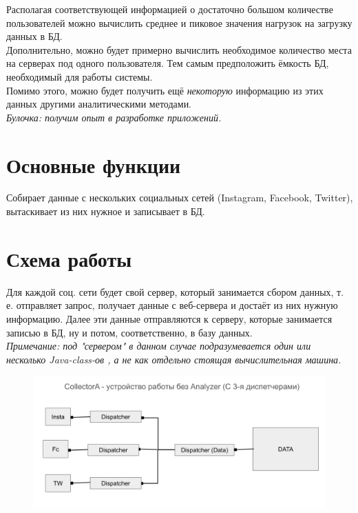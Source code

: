 \documentclass[12pt]{article}
\begin{document}
Располагая соответствующей информацией о достаточно большом количестве пользователей можно вычислить 
среднее и пиковое значения нагрузок на загрузку данных в БД. \\

Дополнительно, можно будет примерно вычислить необходимое количество
места на серверах под одного пользователя. Тем самым предположить ёмкость БД, необходимый для работы системы.\\

Помимо этого, можно будет получить ещё \textit{некоторую} информацию из этих данных другими аналитическими методами.\\

\textit{Булочка: получим опыт в разработке приложений.}

\section*{Основные функции}
Собирает данные с нескольких социальных сетей (Instagram, Facebook, Twitter), вытаскивает из них нужное и записывает в БД.

\section*{Схема работы}
Для каждой соц. сети будет свой сервер, который занимается сбором данных, т. е. отправляет запрос, получает данные 
с веб-сервера и достаёт из них нужную информацию. Далее эти данные отправляются к серверу, которые занимается записью в БД, ну и потом,
соответственно, в базу данных.\\

\textit{Примечание: под "сервером" в данном случае подразумевается один или несколько Java-class-ов , а не как отдельно стоящая вычислительная машина.} 

\begin{figure}[!h]
    \includegraphics[width=\linewidth]{Scheme.png}
\end{figure}
\end{document}
